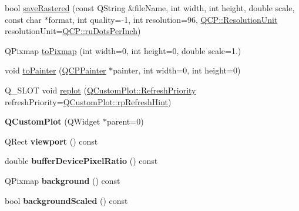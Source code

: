 \begin{DoxyCompactItemize}
\item 
bool \hyperlink{class_q_custom_plot_ad7723ce2edfa270632ef42b03a444352}{save\+Rastered} (const Q\+String \&file\+Name, int width, int height, double scale, const char $\ast$format, int quality=-\/1, int resolution=96, \hyperlink{namespace_q_c_p_a715d46153da230990aa887d0f0602452}{Q\+C\+P\+::\+Resolution\+Unit} resolution\+Unit=\hyperlink{namespace_q_c_p_a715d46153da230990aa887d0f0602452a9def6fd83de9b4108ad999541a42ac6a}{Q\+C\+P\+::ru\+Dots\+Per\+Inch})
\item 
Q\+Pixmap \hyperlink{class_q_custom_plot_aabb974d71ce96c137dc04eb6eab844fe}{to\+Pixmap} (int width=0, int height=0, double scale=1.)
\item 
void \hyperlink{class_q_custom_plot_a1be68d5c0f1e086d6374d1340a193fb9}{to\+Painter} (\hyperlink{class_q_c_p_painter}{Q\+C\+P\+Painter} $\ast$painter, int width=0, int height=0)
\item 
Q\+\_\+\+S\+L\+OT void \hyperlink{class_q_custom_plot_aa4bfe7d70dbe67e81d877819b75ab9af}{replot} (\hyperlink{class_q_custom_plot_a45d61392d13042e712a956d27762aa39}{Q\+Custom\+Plot\+::\+Refresh\+Priority} refresh\+Priority=\hyperlink{class_q_custom_plot_a45d61392d13042e712a956d27762aa39a5349b4ed6366760e34653bc54613a5ad}{Q\+Custom\+Plot\+::rp\+Refresh\+Hint})
\item 
{\bfseries Q\+Custom\+Plot} (Q\+Widget $\ast$parent=0)\hypertarget{class_q_custom_plot_a45b99626558651a6428b83972b0b34b8}{}\label{class_q_custom_plot_a45b99626558651a6428b83972b0b34b8}

\item 
Q\+Rect {\bfseries viewport} () const \hypertarget{class_q_custom_plot_a953ecdbc28018e7e84cb6213ad3d88c2}{}\label{class_q_custom_plot_a953ecdbc28018e7e84cb6213ad3d88c2}

\item 
double {\bfseries buffer\+Device\+Pixel\+Ratio} () const \hypertarget{class_q_custom_plot_a82ba278c2465520017ff269d713dd1bb}{}\label{class_q_custom_plot_a82ba278c2465520017ff269d713dd1bb}

\item 
Q\+Pixmap {\bfseries background} () const \hypertarget{class_q_custom_plot_a4643ddc8249cc4f51725650677c2b779}{}\label{class_q_custom_plot_a4643ddc8249cc4f51725650677c2b779}

\item 
bool {\bfseries background\+Scaled} () const \hypertarget{class_q_custom_plot_af9a6e0fe88e4b8ae5504ee9646abb121}{}\label{class_q_custom_plot_af9a6e0fe88e4b8ae5504ee9646abb121}


\end{DoxyCompactItemize}
